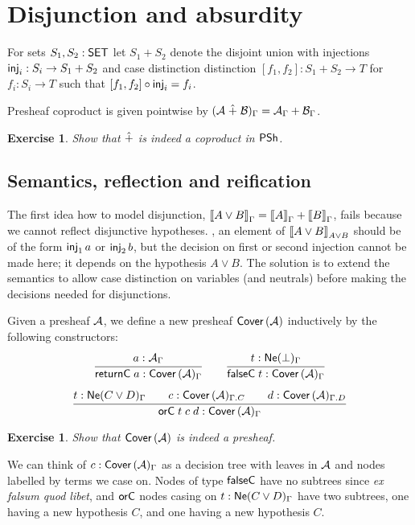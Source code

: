 \documentclass[a4paper]{article}
\newtheorem{exercise}[theorem]{Exercise}
\begin{document}
\section{Disjunction and absurdity}

For sets $S_1,S_2 : \mathsf{SET}$ let $S_1 + S_2$ denote the disjoint union with
injections $\mathsf{inj}_{i} : S_i \to S_1 + S_2$ and case distinction
distinction $[f_1,f_2] : S_1 + S_2 \to T$ for $f_i : S_i \to T$
such that $[f_1,f_2] \circ \mathsf{inj}_{i} = f_i$.

Presheaf coproduct is given pointwise by $(\mathcal{A} \mathrel{\hat{+}} \mathcal{B})_\Gamma = \mathcal{A}_\Gamma + \mathcal{B}_\Gamma$.
\begin{exercise}
  Show that $\mathrel{\hat{+}}$ is indeed a coproduct in $\mathsf{PSh}$.
\end{exercise}


\subsection{Semantics, reflection and reification}

The first idea how to model disjunction,
$\mathopen{{[\kern-0.14em[}} A \lor B \mathclose{{]\kern-0.14em]}}_\Gamma = \mathopen{{[\kern-0.14em[}} A \mathclose{{]\kern-0.14em]}}_\Gamma + \mathopen{{[\kern-0.14em[}} B \mathclose{{]\kern-0.14em]}}_\Gamma$, fails
because we cannot reflect disjunctive hypotheses.  \Eg, an element of
$\mathopen{{[\kern-0.14em[}} A \lor B \mathclose{{]\kern-0.14em]}}_{A \lor B}$ should be of the form $\mathsf{inj}_{1}\,a$ or
$\mathsf{inj}_{2}\,b$, but the decision on first or second injection cannot be
made here;  it depends on the hypothesis $A \lor B$.  The solution is
to extend the semantics to allow case distinction on variables (and
neutrals) before making the decisions needed for disjunctions.

Given a presheaf $\mathcal{A}$, we define a new presheaf $\mathsf{Cover}\,(\mathcal{A})$
inductively by the following constructors:
\begin{gather*}
  \ru{a : \A_\Gamma}{\returnC a : \Cover\A_\Gamma}
\qquad
  \ru{t : \NeG \bot}{\falseC t : \Cover\A_\Gamma}
\\[1ex]
  \ru{t : \NeG{C \lor D} \qquad
      c : \Cover\A_{\Gamma.C} \qquad
      d : \Cover\A_{\Gamma.D}
    }{\orC t c d : \Cover\A_\Gamma}
\end{gather*}
\begin{exercise}
  Show that $\mathsf{Cover}\,(\mathcal{A})$ is indeed a presheaf.
\end{exercise}
We can think of $c : \mathsf{Cover}\,(\mathcal{A})_\Gamma$ as a decision tree with leaves in $\mathcal{A}$
and nodes labelled by terms we case on.  Nodes of type $\mathsf{falseC}$ have
no subtrees since \emph{ex falsum quod libet}, and $\mathsf{orC}$ nodes
casing on $t : \mathsf{Ne}(C \lor D)_{\Gamma}$ have
two subtrees, one having a new hypothesis $C$, and one having a new
hypothesis $C$.
\end{document}
